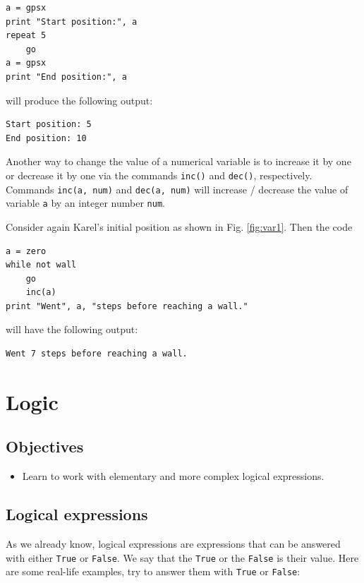\begin{verbatim}
a = gpsx
print "Start position:", a
repeat 5
    go
a = gpsx 
print "End position:", a
\end{verbatim}
will produce the following output:

\begin{verbatim}
Start position: 5
End position: 10
\end{verbatim}
Another way to change the value of a numerical variable is to increase it by one or 
decrease it by one via the commands {\tt inc()} and 
{\tt dec()}, respectively. Commands {\tt inc(a, num)} and 
{\tt dec(a, num)} will increase / decrease the value of variable {\tt a}
by an integer number {\tt num}.

Consider again Karel's initial position as shown 
in Fig. \ref{fig:var1}. Then the code

\begin{verbatim}
a = zero
while not wall
    go
    inc(a)
print "Went", a, "steps before reaching a wall."
\end{verbatim}
will have the following output:

\begin{verbatim}
Went 7 steps before reaching a wall.
\end{verbatim}


\section{Logic} \label{sec:logic}

\subsection{Objectives} 
 
\begin{itemize}
\item Learn to work with elementary and more complex logical expressions.
\end{itemize}

\subsection{Logical expressions}
As we already know, logical expressions are expressions that can be answered with either {\tt True} or 
{\tt False}. We say that the {\tt True} or the {\tt False} is their value. Here are some 
real-life examples, try to answer them with {\tt True} or {\tt False}:

